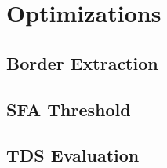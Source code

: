 \section{Optimizations}

\subsection{Border Extraction}

\subsection{SFA Threshold}

\subsection{TDS Evaluation}
